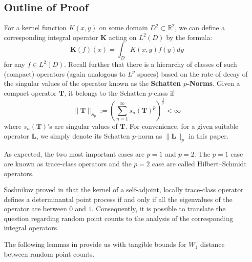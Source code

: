 \documentclass[11pt]{article}
\numberwithin{equation}{section}%
\numberwithin{theorem}{section}
\begin{document}
\subsection{Outline of Proof}
For a kernel function $K(x,y)$ on some domain $D^2\subset\mathbb{R}^2$, we can define a corresponding integral operator $\mathbf{K}$ acting on $L^2(D)$ by the formula:
\begin{equation*}
    \mathbf{K}(f)(x)=\int_D K(x,y)f(y)dy
\end{equation*}
for any $f\in L^2(D)$. Recall further that there is a hierarchy of classes of such (compact) operators (again analogous to $L^p$ spaces) based on the rate of decay of the singular values of the operator known as the \textbf{Schatten $p$-Norms}. Given a compact operator $\mathbf{T}$, it belongs to the Schatten $p$-class if
\begin{equation*}
 \lVert \mathbf{T} \rVert_{S_p}:= \left( \sum_{n=1}^{\infty} s_n(\mathbf{T})^p\right)^{\frac{1}{p}} < \infty
\end{equation*}
where $s_n(\mathbf{T})$'s are singular values of $\mathbf{T}$. For convenience, for a given suitable operator $\mathbf{L}$, we simply denote its Schatten $p$-norm as $\|\mathbf{L}\|_p$ in this paper.

As expected, the two most important cases are $p=1$ and $p=2$. The $p=1$ case are known as trace-class operators and the $p=2$ case are called Hilbert--Schmidt operators.

Soshnikov proved in \cite{soshnikov2000determinantal} that the kernel of a self-adjoint, locally trace-class operator defines a determinantal point process if and only if all the eigenvalues of the operator are between $0$ and $1$. Consequently, it is possible to translate the question regarding random point counts to the analysis of the corresponding integral operators.

The following lemmas in \cite{cai2025mesoscopicratesconvergencehermitian} provide us with tangible bounds for $W_1$ distance between random point counts.
\end{document}
